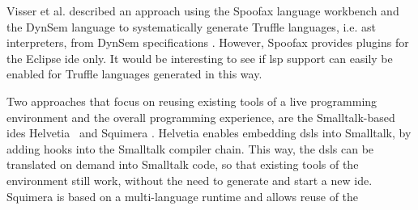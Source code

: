 \documentclass[sigplan,10pt,screen]{acmart}
\begin{document}
Visser et al. described an approach using the Spoofax language workbench
\cite{kats2010spoofax} and the DynSem language
\cite{vergu_et_al:LIPIcs:2015:5208} to systematically generate Truffle
languages, i.e. \ac{ast} interpreters, from DynSem specifications
\cite{visser2014language}. However, Spoofax provides plugins for the Eclipse
\acs{ide} only. It would be interesting to see if \ac{lsp} support can easily be
enabled for Truffle languages generated in this way.
    
Two approaches that focus on reusing existing tools of a live programming
environment and the overall programming experience, are the Smalltalk-based
\acs{ide}s Helvetia~\cite{renggli2010embedding} and Squimera
\cite{niephaus2018live}. Helvetia enables embedding \acp{dsl} into Smalltalk, by
adding hooks into the Smalltalk compiler chain. This way, the \acp{dsl} can be
translated on demand into Smalltalk code, so that existing tools of the
environment still work, without the need to generate and start a new
\acs{ide}. Squimera is based on a multi-language runtime and allows reuse of the
\end{document}

